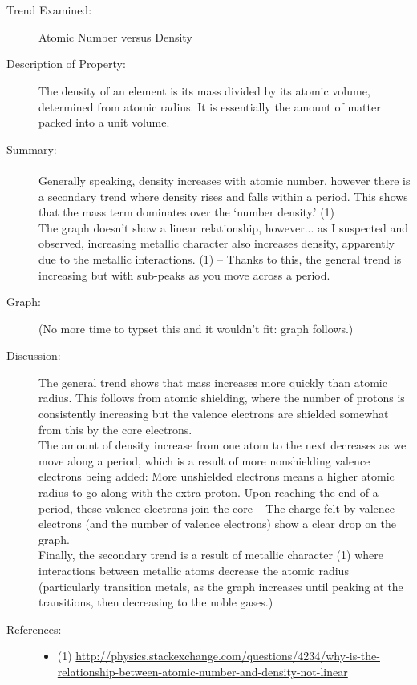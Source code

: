 \documentclass[fleqn,titlepage]{article}
\begin{document}
\section*{}
  \begin{description}
    \item[Trend Examined:] Atomic Number versus Density
    \item[Description of Property:] The density of an element is its mass divided by its atomic volume, determined from atomic radius. It is essentially the amount of matter packed into a unit volume.
    \item[Summary:] \paragraph{} Generally speaking, density increases with atomic number, however there is a secondary trend where density rises and falls within a period. This shows that the mass term dominates over the `number density.' (1) \\
    The graph doesn't show a linear relationship, however... as I suspected and observed, increasing metallic character also increases density, apparently due to the metallic interactions. (1) -- Thanks to this, the general trend is increasing but with sub-peaks as you move across a period.
    \item[Graph:] (No more time to typset this and it wouldn't fit: graph follows.)
    \item[Discussion:] The general trend shows that mass increases more quickly than atomic radius. This follows from atomic shielding, where the number of protons is consistently increasing but the valence electrons are shielded somewhat from this by the core electrons. \\
    The amount of density increase from one atom to the next decreases as we move along a period, which is a result of more nonshielding valence electrons being added: More unshielded electrons means a higher atomic radius to go along with the extra proton. Upon reaching the end of a period, these valence electrons join the core -- The charge felt by valence electrons (and the number of valence electrons) show a clear drop on the graph. \\
    Finally, the secondary trend is a result of metallic character (1) where interactions between metallic atoms decrease the atomic radius (particularly transition metals, as the graph increases until peaking at the transitions, then decreasing to the noble gases.)
    \item[References:] 
      \begin{itemize}
        \item (1) \url{http://physics.stackexchange.com/questions/4234/why-is-the-relationship-between-atomic-number-and-density-not-linear}
      \end{itemize}
  \end{description}
\end{document}
